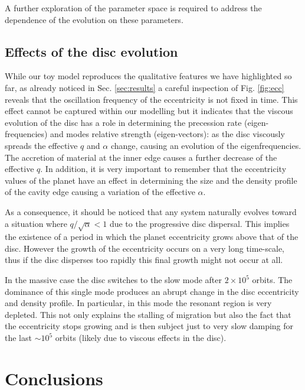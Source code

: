 \documentclass[usenatbib,a4paper,times,fleqn]{mnras}
\begin{document}
A further exploration of the parameter space is required to address the dependence of the evolution on these parameters.

\subsection{Effects of the disc evolution}\label{sec:effectsdiscevo}

While our toy model reproduces the qualitative features we have highlighted so far, as already noticed in Sec. \ref{sec:results} a careful inspection of Fig. \ref{fig:ecc} reveals that the oscillation frequency of the eccentricity is not fixed in time. This effect cannot be captured within our modelling but it indicates that the viscous evolution of the disc has a role in determining the precession rate (eigen-frequencies) and modes relative strength (eigen-vectors): as the disc viscously spreads the effective $q$ and $\alpha$ change, causing an evolution of the eigenfrequencies. The accretion of material at the inner edge causes a further decrease of the effective $q$. In addition, it is very important to remember that the eccentricity values of the planet have an effect in determining the size and the density profile of the cavity edge \citep{artymowicz1994,thun2017} causing a variation of the effective $\alpha$.

As a consequence, it should be noticed that any system naturally evolves toward a situation where $q/\sqrt{\alpha}<1$ due to the progressive disc dispersal. This implies the existence of a period in which the planet eccentricity grows above that of the disc. However the growth of the eccentricity occurs on a very long time-scale, thus if the disc disperses too rapidly this final growth might not occur at all.

In the massive case the disc switches to the slow mode after $2\times 10^5$ orbits. The dominance of this single mode produces an abrupt change in the disc eccentricity and density profile. In particular, in this mode the resonant region is very depleted.
This not only explains the stalling of migration but also the fact that the eccentricity stops growing and is then subject just to very slow damping for the last $\sim 10^5$ orbits (likely due to viscous effects in the disc).

\section{Conclusions}\label{sec:conclusions}
\end{document}
